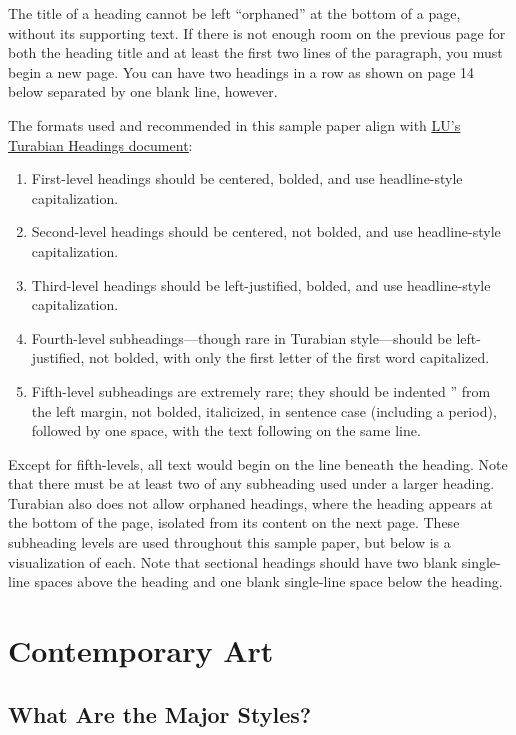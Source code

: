 \documentclass[raggedright]{turabian-researchpaper}
\newcommand*{\bluehref}[2]{\href{#1}{\color{blue}\ul{#2}}}
\begin{document}
The title of a heading cannot be left ``orphaned'' at the bottom of a page,
without its supporting text.\autocite[393]{Turabian} If there is not enough room
on the previous page for both the heading title and at least the first two lines
of the paragraph, you must begin a new page. You can have two headings in a row
as shown on page 14 below separated by one blank line, however.

The formats used and recommended in this sample paper align with
\bluehref{http://www.liberty.edu/academics/graduate/writing/index.cfm?PID=34282}{LU's
Turabian Headings document}:
\begin{enumerate}
\item First-level headings should be centered, bolded, and use headline-style
  capitalization.
\item Second-level headings should be centered, not bolded, and use
  headline-style capitalization.
\item Third-level headings should be left-justified, bolded, and use
  headline-style capitalization.
\item Fourth-level subheadings---though rare in Turabian style---should be
  left-justified, not bolded, with only the first letter of the first word
  capitalized.
\item Fifth-level subheadings are extremely rare; they should be indented
  '' from the left margin, not bolded, italicized, in sentence case
  (including a period), followed by one space, with the text following on the
  same line.
\end{enumerate}

Except for fifth-levels, all text would begin on the line beneath the heading.
Note that there must be at least two of any subheading used under a larger
heading. Turabian also does not allow orphaned headings, where the heading
appears at the bottom of the page, isolated from its content on the next
page.\autocite[393]{Turabian} These subheading levels are used throughout this
sample paper, but below is a visualization of each. Note that sectional headings
should have two blank single-line spaces above the heading and one blank
single-line space below the heading.

\section*{Contemporary Art}

\subsection{What Are the Major Styles?}
\end{document}
